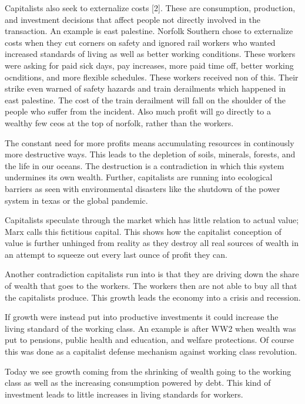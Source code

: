 \documentclass{article}
\begin{document}
Capitalists also seek to externalize costs [2]. These are consumption, production, and investment decisions that affect people not directly involved in the transaction. An example is east palestine. Norfolk Southern chose to externalize costs when they cut corners on safety and ignored rail workers who wanted increased standards of living as well as better working conditions. These workers were asking for paid sick days, pay increases, more paid time off, better working ocnditions, and more flexible schedules. These workers received non of this. Their strike even warned of safety hazards and train derailments which happened in east palestine. The cost of the train derailment will fall on the shoulder of the people who suffer from the incident. Also much profit will go directly to a wealthy few ceos at the top of norfolk, rather than the workers.

The constant need for more profits means accumulating resources in continously more destructive ways. This leads to the depletion of soils, minerals, forests, and the life in our oceans. The destruction is a contradiction in which this system undermines its own wealth. Further, capitalists are running into ecological barriers as seen with environmental disasters like the shutdown of the power system in texas or the global pandemic.

Capitalists speculate through the market which has little relation to actual value; Marx calls this fictitious capital. This shows how the capitalist conception of value is further unhinged from reality as they destroy all real sources of wealth in an attempt to squeeze out every last ounce of profit they can.

Another contradiction capitalists run into is that they are driving down the share of wealth that goes to the workers. The workers then are not able to buy all that the capitalists produce. This growth leads the economy into a crisis and recession.

If growth were instead put into productive investments it could increase the living standard of the working class. An example is after WW2 when wealth was put to pensions, public health and education, and welfare protections. Of course this was done as a capitalist defense mechanism against working class revolution.

Today we see growth coming from the shrinking of wealth going to the working class as well as the increasing consumption powered by debt. This kind of investment leads to little increases in living standards for workers.
\end{document}
